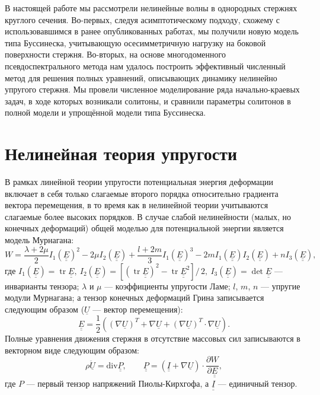 \documentclass[12pt, a4paper]{article}
\DeclareMathOperator{\trace}{tr}
\newcommand{\lb}{\left (}
\newcommand{\rb}{\right )}
\newcommand{\lsq}{\left [}
\newcommand{\rsq}{\right ]}
\newcommand{\vect}[1]{\underline{#1}}
\newcommand{\tens}[1]{\underline{\underline{#1}}}
\newcommand{\divg}{\text{div}}
\newcommand{\pdiff}[2]{\frac{\partial #1}{\partial #2}}
\begin{document}
В настоящей работе мы рассмотрели нелинейные волны в однородных стержнях круглого сечения. Во-первых, следуя асимптотическому подходу, схожему с использовавшимся в ранее опубликованных работах, мы получили новую модель типа Буссинеска, учитывающую осесимметричную нагрузку на боковой поверхности стержня. Во-вторых, на основе многодоменного псевдоспектрального метода нам удалось построить эффективный численный метод для решения полных уравнений, описывающих динамику нелинейно упругого стержня. Мы провели численное моделирование ряда начально-краевых задач, в ходе которых возникали солитоны, и сравнили параметры солитонов в полной модели и упрощённой модели типа Буссинеска.

\section{Нелинейная теория упругости}
В рамках линейной теории упругости потенциальная энергия деформации включает в себя только слагаемые второго порядка относительно градиента вектора перемещения, в то время как в нелинейной теории учитываются слагаемые более высоких порядков. В случае слабой нелинейности (малых, но конечных деформаций) общей моделью для потенциальной энергии является модель Мурнагана:
\begin{equation}\label{murnaghan}
W = \frac{\lambda + 2\mu}{2}I_1(\tens{E})^2 - 2\mu I_2(\tens{E}) + \frac{l+2m}{3}I_1(\tens{E})^3 - 2m I_1(\tens{E}) I_2(\tens{E}) + n I_3(\tens{E}),
\end{equation}
где $I_1(\tens{E}) = \trace \tens{E},\  I_2(\tens{E}) = \lsq(\trace \tens{E})^2 - \trace \tens{E}^2\rsq/\,2,\ I_3(\tens{E}) = \det \tens{E}$ --- инварианты тензора; $\lambda$ и $\mu$ --- коэффициенты упругости Ламе; $l$, $m$, $n$ --- упругие модули Мурнагана; а тензор конечных деформаций Грина записывается следующим образом ($\vect{U}$ --- вектор перемещения):
\begin{equation}\label{1_strain}
\tens{E} = \frac12 \lb(\nabla\vect{U})^T + \nabla\vect{U} + (\nabla\vect{U})^T\cdot\nabla\vect{U}\rb.
\end{equation}
Полные уравнения движения стержня в отсутствие массовых сил записываются в векторном виде следующим образом:
\begin{equation}\label{full_eqns}
\rho\ddot{\vect{U}} = \divg\tens{P}, \qquad \tens{P} = (\tens{I} + \nabla\vect{U}) \cdot \pdiff{W}{\tens{E}},
\end{equation}
где $P$ --- первый тензор напряжений Пиолы-Кирхгофа, а $\tens{I}$ --- единичный тензор.
\end{document}
